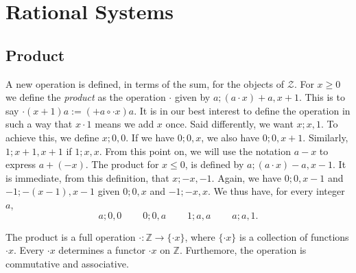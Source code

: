 \documentclass [12pt]{book}
\begin{document}
	\section{Rational Systems}

		\subsection{Product}

A new operation is defined, in terms of the sum, for the objects of $\mathcal Z$. For $x\geq0$ we define the \textit{product} as the operation $\cdot$ given by $a;(a\cdot x)+a,x+1$. This is to say $\cdot(x+1)a:=(+a\circ\cdot x)a$. It is in our best interest to define the operation in such a way that $x\cdot1$ means we add $x$ once. Said differently, we want $x;x,1$. To achieve this, we define $x;0,0$. If we have $0;0,x$, we also have $0;0,x+1$. Similarly, $1;x+1,x+1$ if $1;x,x$. From this point on, we will use the notation $a-x$ to express $a+(-x)$. The product for $x\leq0$, is defined by $a;(a\cdot x)-a,x-1$. It is immediate, from this definition, that $x;-x,-1$. Again, we have $0;0,x-1$ and $-1;-(x-1),x-1$ given $0;0,x$ and $-1;-x,x$. We thus have, for every integer $a$,
\[a;0,0~~~~~~~~~~0;0,a~~~~~~~~~~1;a,a~~~~~~~~~~a;a,1.\]

\begin{theorem}The product is a full operation $\cdot:\mathbb Z\rightarrow\{\cdot x\}$, where $\{\cdot x\}$ is a collection of functions $\cdot x$. Every $\cdot x$ determines a functor $\cdot x$ on $\mathbb Z$. Furthemore, the operation is commutative and associative.\end{theorem}
\end{document}
